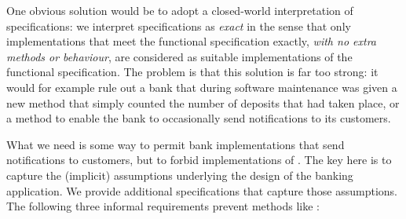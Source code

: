One obvious solution would be to adopt %
a closed-world
interpretation of specifications: we interpret  specifications  
as \emph{exact} in the sense that only
implementations that meet the functional specification exactly,
\emph{with no extra methods or behaviour}, are considered as suitable
implementations of the functional specification. The problem is that
this solution is far too strong: it would for example rule out a bank
that  during software maintenance was given a new method 
that simply counted the number of deposits that had taken place, or a method 
to enable the bank to occasionally send notifications  to its customers.
%
%


What we need is some way to permit bank implementations that 
send notifications to customers, but to forbid implementations of . %
The key here is to capture the (implicit)
assumptions underlying %
the design of the banking application.
 We provide
additional specifications that capture those assumptions.  The following
 three informal requirements   prevent methods like :


